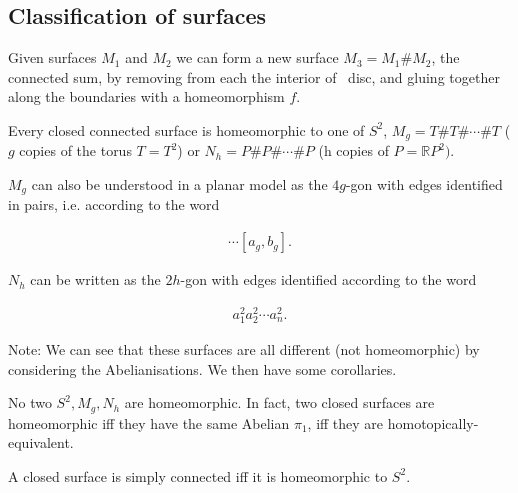 \subsection{Classification of surfaces}

Given surfaces $M_{1}$ and $M_{2}$ we can form a new surface $M_{3}=M_{1}\#M_{2}$,
the connected sum, by removing from each the interior of ~disc, and
gluing together along the boundaries with a homeomorphism $f$.
\begin{fact}
Every closed connected surface is homeomorphic to one of $S^{2}$,
$M_{g}=T\#T\#\cdots\#T$ ($g$ copies of the torus $T=T^{2}$) or
$N_{h}=P\#P\#\cdots\#P$ (h copies of $P=\mathbb{R}P^{2})$.
\end{fact}
$M_{g}$ can also be understood in a planar model as the $4g$-gon
with edges identified in pairs, i.e. according to the word

\begin{align*}
[a_{1},b_{1}][a_{2},b_{2}]\cdots[a_{g},b_{g}].
\end{align*}


$N_{h}$ can be written as the $2h$-gon with edges identified according
to the word

\begin{align*}
a_{1}^{2}a_{2}^{2}\cdots a_{n}^{2}.
\end{align*}


Note: We can see that these surfaces are all different (not homeomorphic)
by considering the Abelianisations. We then have some corollaries.
\begin{cor}
No two $S^{2},M_{g},N_{h}$ are homeomorphic. In fact, two closed
surfaces are homeomorphic iff they have the same Abelian $\pi_{1}$,
iff they are homotopically-equivalent.
\end{cor}

\begin{cor}
A closed surface is simply connected iff it is homeomorphic to $S^{2}$.
\end{cor}

